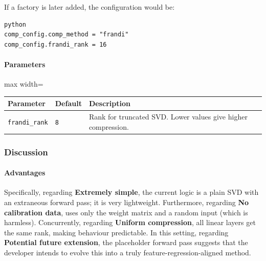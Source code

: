 If a factory is later added, the configuration would be:

\vspace{0.5em}
\begin{mdframed}[backgroundcolor=codebg, linecolor=codeframe, linewidth=1pt, roundcorner=4pt, innerleftmargin=2pt, innerrightmargin=5pt, innertopmargin=5pt, innerbottommargin=5pt]
\begin{lstlisting}
python
comp_config.comp_method = "frandi"
comp_config.frandi_rank = 16
\end{lstlisting}
\end{mdframed}
\vspace{0.5em}

\paragraph{Parameters}

\begin{center}
\begin{adjustbox}{max width=\columnwidth}
\renewcommand{\arraystretch}{1.2}
\begin{tabular}{lll}
\toprule
Parameter & Default & Description \\
\midrule
\texttt{frandi\_rank} & \texttt{8} & Rank for truncated SVD. Lower values give higher compression. \\

\bottomrule
\end{tabular}
\end{adjustbox}
\end{center}

\subsubsection*{Discussion}

\paragraph{Advantages}

Specifically, regarding \textbf{Extremely simple}, the current logic is a plain SVD with an extraneous forward pass; it is very lightweight. Furthermore, regarding \textbf{No calibration data}, uses only the weight matrix and a random input (which is harmless). Concurrently, regarding \textbf{Uniform compression}, all linear layers get the same rank, making behaviour predictable. In this setting, regarding \textbf{Potential future extension}, the placeholder forward pass suggests that the developer intends to evolve this into a truly feature-regression-aligned method.


